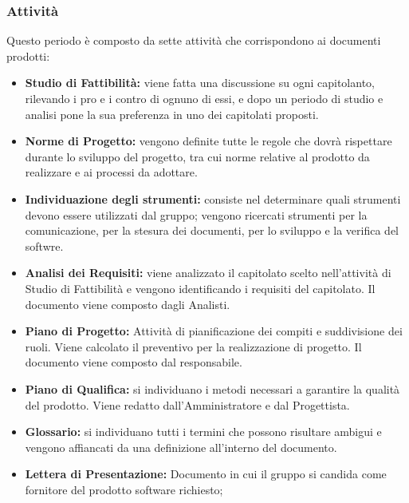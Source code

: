 \subsubsection{Attività}
Questo periodo è composto da sette attività che corrispondono ai documenti prodotti:
\begin{itemize}
	\item \textbf{Studio di Fattibilità:} viene fatta una discussione su ogni capitolanto, rilevando i pro e i contro di ognuno di essi, e dopo un periodo di studio e analisi \Gruppo pone la sua preferenza in uno dei capitolati proposti.
	\item \textbf{Norme di Progetto:} vengono definite tutte le regole che \Gruppo dovrà rispettare durante lo sviluppo del progetto, tra cui norme relative al prodotto da realizzare e ai processi da adottare.
	\item \textbf{Individuazione degli strumenti:} consiste nel determinare quali strumenti devono essere utilizzati dal gruppo; vengono ricercati strumenti per la comunicazione, per la stesura dei documenti, per lo sviluppo e la verifica del softwre. 
	\item \textbf{Analisi dei Requisiti:} viene analizzato il capitolato scelto nell'attività di Studio di Fattibilità e vengono identificando i requisiti del capitolato. Il documento viene composto dagli Analisti.
	\item \textbf{Piano di Progetto:} Attività di pianificazione dei compiti e suddivisione dei ruoli. Viene calcolato il preventivo per la realizzazione di progetto. Il documento viene composto dal responsabile.
	\item \textbf{Piano di Qualifica:} si individuano i metodi necessari a garantire la qualità del prodotto. Viene redatto dall'Amministratore e dal Progettista.
	\item\textbf{Glossario:} si individuano tutti i termini che possono risultare ambigui e vengono affiancati da una definizione all'interno del documento.  
	\item \textbf{Lettera di Presentazione:} Documento in cui il gruppo \Gruppo si candida come fornitore del prodotto software richiesto;
\end{itemize}
